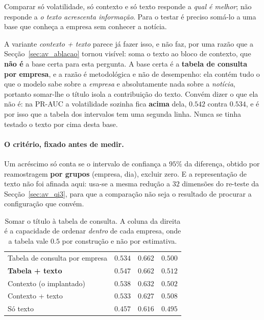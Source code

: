 Comparar só volatilidade, só contexto e só texto responde a \emph{qual é melhor}; não responde a
\emph{o texto acrescenta informação}. Para o testar é preciso somá-lo a uma base que conheça a
empresa sem conhecer a notícia.

A variante \emph{contexto + texto} parece já fazer isso, e não faz, por uma razão que a
Secção~\ref{sec:av_ablacao} tornou visível: soma o texto ao bloco de contexto, que \textbf{não é}
a base certa para esta pergunta. A base certa é a \textbf{tabela de consulta por empresa}, e a
razão é metodológica e não de desempenho: ela contém tudo o que o modelo sabe sobre a
\emph{empresa} e absolutamente nada sobre a \emph{notícia}, portanto somar-lhe o título isola a
contribuição do texto. Convém dizer o que ela não é: na PR-AUC a volatilidade sozinha fica
\textbf{acima} dela, $0.542$ contra $0.534$, e é por isso que a tabela dos intervalos tem uma
segunda linha. Nunca se tinha testado o texto por cima desta base.

\paragraph{O critério, fixado antes de medir.} Um acréscimo só conta se o intervalo de confiança
a $95\%$ da diferença, obtido por reamostragem \textbf{por grupos} (empresa, dia), excluir zero. E
a representação de texto não foi afinada aqui: usa-se a mesma redução a $32$ dimensões do
re-teste da Secção~\ref{sec:av_qi3}, para que a comparação não seja o resultado de procurar a
configuração que convém.

\begin{table}[ht]
\caption[O texto por cima da tabela de consulta]{Somar o título à tabela de consulta. A coluna
da direita é a capacidade de ordenar \emph{dentro} de cada empresa, onde a tabela vale $0.5$ por
construção e não por estimativa.}
\label{tab:av_acrescimo}
\centering
\small
\begin{tabular}{L{0.40\textwidth} C{0.13\textwidth} C{0.13\textwidth} C{0.17\textwidth}}
\toprule
{} &  &  &  \\
\midrule
Tabela de consulta por empresa & $0.534$ & $\mathbf{0.662}$ & $0.500$ \\
\textbf{Tabela + texto} & $\mathbf{0.547}$ & $\mathbf{0.662}$ & $0.512$ \\
Contexto (o implantado) & $0.538$ & $0.632$ & $0.502$ \\
Contexto + texto & $0.533$ & $0.627$ & $0.508$ \\
Só texto & $0.457$ & $0.616$ & $0.495$ \\
\bottomrule
\end{tabular}
\end{table}


